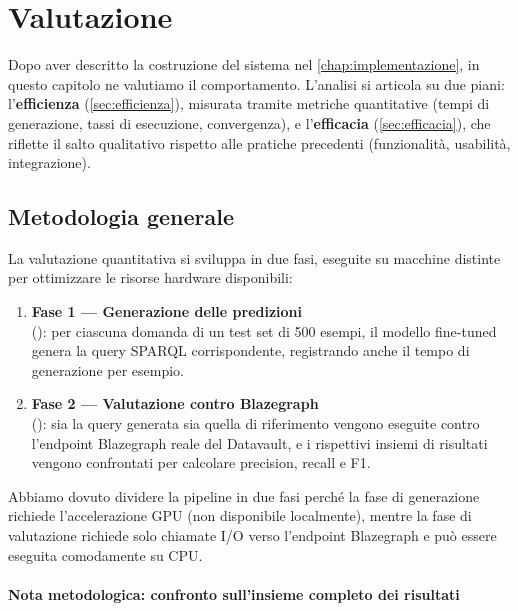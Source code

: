 \chapter{Valutazione}\label{chap:valutazione}

Dopo aver descritto la costruzione del sistema nel \cref{chap:implementazione}, in questo capitolo ne valutiamo il comportamento. L'analisi si articola su due piani: l'\textbf{efficienza} (\cref{sec:efficienza}), misurata tramite metriche quantitative (tempi di generazione, tassi di esecuzione, convergenza), e l'\textbf{efficacia} (\cref{sec:efficacia}), che riflette il salto qualitativo rispetto alle pratiche precedenti (funzionalità, usabilità, integrazione).

\section{Metodologia generale}\label{sec:metodologia}

La valutazione quantitativa si sviluppa in due fasi, eseguite su macchine distinte per ottimizzare le risorse hardware disponibili:


\begin{enumerate}
    \item \textbf{Fase 1 --- Generazione delle predizioni} \\ 
    (): per ciascuna domanda di un test set di 500 esempi, il modello fine-tuned genera la query SPARQL corrispondente, registrando anche il tempo di generazione per esempio.
    \item \textbf{Fase 2 --- Valutazione contro Blazegraph} \\
    (): sia la query generata sia quella di riferimento vengono eseguite contro l'endpoint Blazegraph reale del Datavault, e i rispettivi insiemi di risultati vengono confrontati per calcolare precision, recall e F1.
\end{enumerate}


Abbiamo dovuto dividere la pipeline in due fasi perché la fase di generazione richiede l'accelerazione GPU (non disponibile localmente), mentre la fase di valutazione richiede solo chiamate I/O verso l'endpoint Blazegraph e può essere eseguita comodamente su CPU.\@

\newpage

\subsubsection{Nota metodologica: confronto sull'insieme completo dei risultati}\label{subsec:nota_metodologica}

